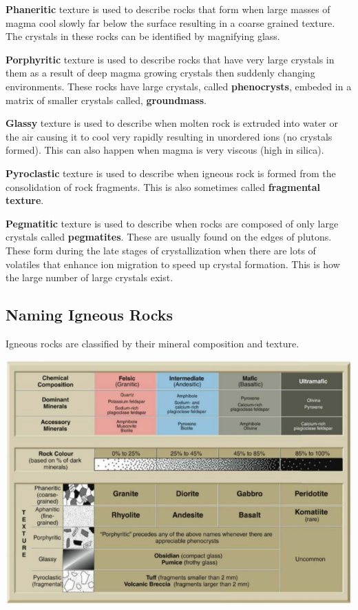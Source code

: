 \documentclass{article}
\begin{document}
\textbf{Phaneritic} texture is used to describe rocks that form when large masses of magma cool slowly far below the surface resulting in a coarse grained texture. The crystals in these rocks can be identified by magnifying glass.

\textbf{Porphyritic} texture is used to describe rocks that have very large crystals in them as a result of deep magma growing crystals then suddenly changing environments. These rocks have large crystals, called \textbf{phenocrysts}, embeded in a matrix of smaller crystals called, \textbf{groundmass}.

\textbf{Glassy} texture is used to describe when molten rock is extruded into water or the air causing it to cool very rapidly resulting in unordered ions (no crystals formed). This can also happen when magma is very viscous (high in silica).

\textbf{Pyroclastic} texture is used to describe when igneous rock is formed from the consolidation of rock fragments. This is also sometimes called \textbf{fragmental texture}.

\textbf{Pegmatitic} texture is used to describe when rocks are composed of only large crystals called \textbf{pegmatites}. These are usually found on the edges of plutons. These form during the late stages of crystallization when there are lots of volatiles that enhance ion migration to speed up crystal formation. This is how the large number of large crystals exist.


\subsection*{Naming Igneous Rocks} %
\label{sub:naming_igneous_rocks}
Igneous rocks are classified by their mineral composition and texture.

\includegraphics[width=7in]{igneous-classes}
\end{document}
